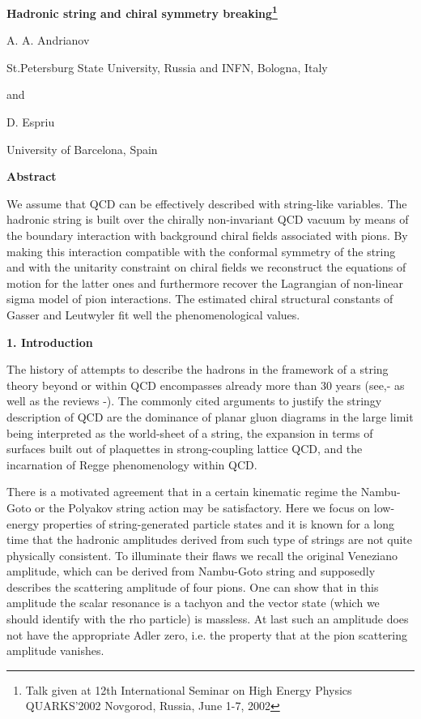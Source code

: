 \documentclass[a4paper,12pt]{article}
\begin{document}
\renewcommand{\thefootnote}{\fnsymbol{footnote}} 
\centerline{\Large\bf Hadronic string and chiral symmetry 
breaking\footnote{Talk given at
12th International Seminar on High Energy Physics QUARKS'2002
                        Novgorod, Russia, June 1-7, 2002}}

\bigskip

\centerline{
\large A. A. Andrianov}
\centerline{St.Petersburg State University, Russia and INFN, Bologna, 
Italy}
\centerline{and}
\centerline{\large D. Espriu}
\centerline{University of Barcelona, Spain}

\bigskip

\centerline{\bf Abstract}
{\small
We assume that QCD can be effectively described
with string-like variables.
The hadronic string is built over the 
chirally non-invariant QCD vacuum by means of the boundary interaction
with background chiral fields associated with pions. By making this interaction
compatible with the conformal symmetry of the string and 
with the unitarity constraint 
on chiral fields we reconstruct the equations of motion for the latter ones 
and furthermore recover the Lagrangian of non-linear sigma model of pion 
interactions. The estimated chiral structural constants of 
Gasser and Leutwyler 
fit well the phenomenological values.}\\

\centerline{\large\bf 1. Introduction}

\medskip

The history of attempts to describe the hadrons in the framework of
a string theory beyond or within QCD encompasses already  
more than 30 years (see,\cite{Ven}-\cite{solo} as well as 
the reviews \cite{Rebbi}-\cite{pol}). 
The commonly cited arguments to justify the stringy description of QCD
 are the dominance of planar gluon diagrams
in the large \coordHE{} limit\cite{largeN} 
being interpreted as the world-sheet of a string,
the expansion in terms of surfaces built out of plaquettes
in strong-coupling lattice QCD\cite{lattice}, and 
the incarnation of
Regge phenomenology\cite{regge} within QCD\cite{Lip}.

There is a motivated 
agreement that in a certain
kinematic regime the  Nambu-Goto or the Polyakov
string action may be satisfactory. Here we focus on 
low-energy properties of string-generated particle states 
and it is known for a long
time that the hadronic amplitudes derived from such type of strings
are not quite physically consistent.  
To illuminate their flaws we recall
the original Veneziano amplitude\cite{Ven}, which can be derived from
Nambu-Goto string and supposedly describes the 
scattering amplitude of four
pions. One can show that in this amplitude the scalar resonance is  
a tachyon and the vector state (which we should
identify with the rho particle) is massless. 
At last such an amplitude does not have the appropriate Adler
zero, i.e. the property that at \coordHE{} the pion scattering amplitude 
vanishes.
\end{document}
